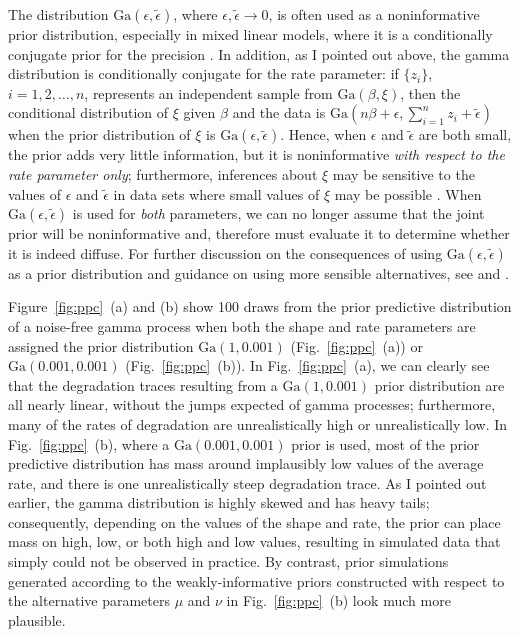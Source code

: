 The distribution $\mbox{Ga}(\epsilon, \tilde{\epsilon})$, where $\epsilon, \tilde{\epsilon}\longrightarrow 0$, is often used as a noninformative prior distribution, especially in mixed linear models, where it is a conditionally conjugate prior for the precision \citep[p.~33]{hodges_2014}. In addition, as I pointed out above, the gamma distribution is conditionally conjugate for the rate parameter: if $\{ z_i \}$, $i = 1, 2, \ldots, n$, represents an independent sample from $\mbox{Ga}(\beta, \xi)$, then the conditional distribution of $\xi$ given $\beta$ and the data is $\mbox{Ga}(n\beta + \epsilon, \sum_{i=1}^n z_i + \tilde{\epsilon})$ when the prior distribution of $\xi$ is $\mbox{Ga}(\epsilon, \tilde{\epsilon})$. Hence, when $\epsilon$ and $\tilde{\epsilon}$ are both small, the prior adds very little information, but it is noninformative \textit{with respect to the rate parameter only}; furthermore, inferences about $\xi$ may be sensitive to the values of $\epsilon$ and $\tilde{\epsilon}$ in data sets where small values of $\xi$ may be possible \citep[p.~130]{gelman_workflow_2020}. When $\mbox{Ga}(\epsilon, \tilde{\epsilon})$ is used for \textit{both} parameters, we can no longer assume that the joint prior will be noninformative and, therefore must evaluate it to determine whether it is indeed diffuse. For further discussion on the consequences of using $\mbox{Ga}(\epsilon, \tilde{\epsilon})$ as a prior distribution and guidance on using more sensible alternatives, see \cite{hodges_2014} and \cite{gelman_workflow_2020}.

Figure~\ref{fig:ppc}~(a) and (b) show 100 draws from the prior predictive distribution of a noise-free gamma process when both the shape and rate parameters are assigned the prior distribution $\mbox{Ga}(1, 0.001)$ (Fig.~\ref{fig:ppc}~(a)) or $\mbox{Ga}(0.001, 0.001)$ (Fig.~\ref{fig:ppc}~(b)). In Fig.~\ref{fig:ppc}~(a), we can clearly see that the degradation traces resulting from a $\mbox{Ga}(1, 0.001)$ prior distribution are all nearly linear, without the jumps expected of gamma processes; furthermore, many of the rates of degradation are unrealistically high or unrealistically low. In Fig.~\ref{fig:ppc}~(b), where a $\mbox{Ga}(0.001, 0.001)$ prior is used, most of the prior predictive distribution has mass around implausibly low values of the average rate, and there is one unrealistically steep degradation trace. As I pointed out earlier, the gamma distribution is highly skewed and has heavy tails; consequently, depending on the values of the shape and rate, the prior can place mass on high, low, or both high and low values, resulting in simulated data that simply could not be observed in practice. By contrast, prior simulations generated according to the weakly-informative priors constructed with respect to the alternative parameters $\mu$ and $\nu$ in Fig.~\ref{fig:ppc}~(b) look much more plausible.

